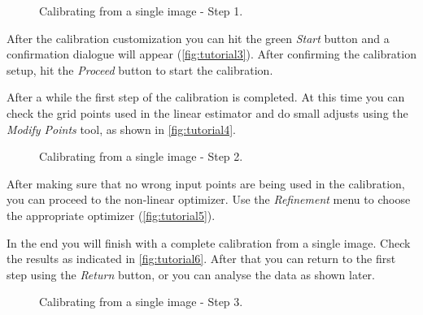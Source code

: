 \documentclass[article,11pt]{memoir}
\begin{document}
\begin{figure}[h]
\centering
{}
\caption{Calibrating from a single image - Step 1.}
\label{fig:step1}
\end{figure}

After the calibration customization you can hit the green \textit{Start} button and a confirmation dialogue will appear (\figurename \ref{fig:tutorial3}). After confirming the calibration setup, hit the \textit{Proceed} button to start the calibration.

After a while the first step of the calibration is completed. At this time you can check the grid points used in the linear estimator and do small adjusts using the \textit{Modify Points} tool, as shown in \figurename \ref{fig:tutorial4}.

\begin{figure}[h]
\centering
{}
\caption{Calibrating from a single image - Step 2.}
\label{fig:step2}
\end{figure}


After making sure that no wrong input points are being used in the calibration, you can proceed to the non-linear optimizer. Use the \textit{Refinement} menu to choose the appropriate optimizer (\figurename \ref{fig:tutorial5}). 

In the end you will finish with a complete calibration from a single image. Check the results as indicated in \figurename \ref{fig:tutorial6}. After that you can return to the first step using the \textit{Return} button, or you can analyse the data as shown later. 


\begin{figure}[h]
\centering
{}
\caption{Calibrating from a single image - Step 3.}
\label{fig:step3}
\end{figure}
\end{document}
